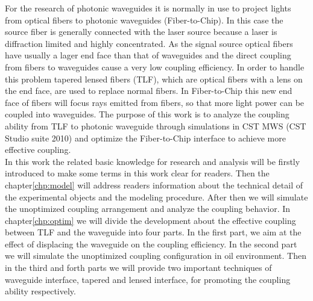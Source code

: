 
For the research of photonic waveguides it is normally in use to project lights from optical fibers to photonic waveguides (Fiber-to-Chip). In this case the source fiber is generally connected with the laser source because a laser is diffraction limited and highly concentrated. As the signal source optical fibers have usually a lager end face than that of waveguides and the direct coupling from fibers to waveguides cause a very low coupling efficiency. In order to handle this problem tapered lensed fibers (TLF), which are optical fibers with a lens on the end face, are used to replace normal fibers. In Fiber-to-Chip  this new end face of fibers will focus rays emitted from fibers, so that more light power can be coupled into waveguides. The purpose of this work is to analyze the coupling ability from TLF to photonic waveguide through simulations in CST MWS  (CST Studio suite 2010) and optimize the Fiber-to-Chip interface to achieve more effective coupling.\\

In this work the related basic knowledge for research and analysis will be firstly introduced to make some terms in this work clear for readers. Then the chapter\ref{chp:model} will address readers information about the technical detail of the experimental objects and the modeling procedure. After then we will simulate the unoptimized coupling arrangement and analyze the coupling behavior. In chapter\ref{chp:optim} we will divide the development about the effective coupling between TLF and the waveguide  into four parts. In the first part, we aim at the effect of displacing the waveguide on the coupling efficiency. In the second part we will simulate the unoptimized coupling configuration in oil environment. Then in the third and forth parts we will provide two important techniques of waveguide interface, tapered and lensed interface, for promoting the coupling ability respectively.\\  
